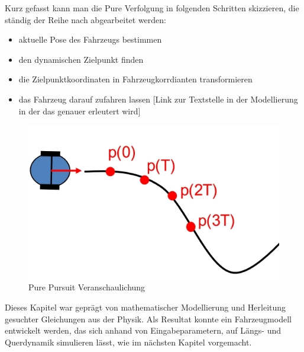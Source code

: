 Kurz gefasst kann man die Pure Verfolgung in folgenden Schritten skizzieren, die ständig der Reihe nach abgearbeitet werden:
\begin{itemize}
\item aktuelle Pose des Fahrzeugs bestimmen
\item den dynamischen Zielpunkt finden
\item die Zielpunktkoordinaten in Fahrzeugkorrdianten transformieren
\item das Fahrzeug darauf zufahren lassen [Link zur Textstelle in der Modellierung in der das genauer erleutert wird]
\end{itemize} 
\begin{figure}[htb]
  \centering  
  \includegraphics[scale=1.4]{img/purePursuit.jpg}
  \caption{Pure Pursuit Veranschaulichung\cite{robot}}
  \label{fig:starwars}
\end{figure}
Dieses Kapitel war geprägt von mathematischer Modellierung und Herleitung gesuchter Gleichungen aus der Physik. Als Resultat konnte ein Fahrzeugmodell entwickelt werden, das sich anhand von Eingabeparametern, auf Längs- und Querdynamik simulieren lässt, wie im nächsten Kapitel vorgemacht.\\
